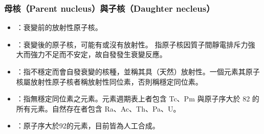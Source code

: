 \documentclass[a4paper,12pt]{article}
\begin{document}
\subsubsection{母核（Parent nucleus）與子核（Daughter necleus）}
\begin{itemize}
\item {}：衰變前的放射性原子核。
\item {}：衰變後的原子核，可能有或沒有放射性。
\eit
{}
指原子核因質子間靜電排斥力強大而強力不足而不安定，故自發發生衰變反應。
\bit
\item {}：指不穩定而會自發衰變的核種，並稱其具（天然）放射性。一個元素其原子核屬放射性原子核者稱放射性同位素，否則稱穩定同位素。
\item {}：指無穩定同位素之元素。元素週期表上者包含 Tc、Pm 與原子序大於 82 的所有元素。自然存在者包含 Ra、Ac、Th、Pa、U。
\item {}：原子序大於92的元素，目前皆為人工合成。
\eit


\end{itemize}
\end{document}
